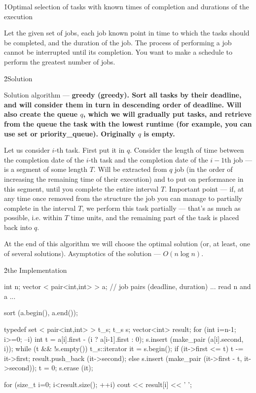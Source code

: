 \h1{Optimal selection of tasks with known times of completion and durations of the execution}

Let the given set of jobs, each job known point in time to which the tasks should be completed, and the duration of the job. The process of performing a job cannot be interrupted until its completion. You want to make a schedule to perform the greatest number of jobs.

\h2{Solution}

Solution algorithm --- \bf{greedy} (greedy). Sort all tasks by their deadline, and will consider them in turn in descending order of deadline. Will also create the queue $q$, which we will gradually put tasks, and retrieve from the queue the task with the lowest runtime (for example, you can use set or priority_queue). Originally $q$ is empty.

Let us consider $i$-th task. First put it in $q$. Consider the length of time between the completion date of the $i$-th task and the completion date of the $i-1$th job --- is a segment of some length $T$. Will be extracted from $q$ job (in the order of increasing the remaining time of their execution) and to put on performance in this segment, until you complete the entire interval $T$. Important point --- if, at any time once removed from the structure the job you can manage to partially complete in the interval $T$, we perform this task partially --- that's as much as possible, i.e. within $T$ time units, and the remaining part of the task is placed back into $q$.

At the end of this algorithm we will choose the optimal solution (or, at least, one of several solutions). Asymptotics of the solution --- $O (n \log n)$.


\h2{the Implementation}


\code
int n;
vector < pair<int,int> > a; // job pairs (deadline, duration)
... read n and a ...

sort (a.begin(), a.end());

typedef set < pair<int,int> > t_s;
t_s s;
vector<int> result;
for (int i=n-1; i>=0; --i) {
int t = a[i].first - (i ? a[i-1].first : 0);
s.insert (make_pair (a[i].second, i));
while (t && !s.empty()) {
t_s::iterator it = s.begin();
if (it->first <= t) {
t -= it->first;
result.push_back (it->second);
}
else {
s.insert (make_pair (it->first - t, it->second));
t = 0;
}
s.erase (it);
}
}

for (size_t i=0; i<result.size(); ++i)
cout << result[i] << ' ';
\endcode